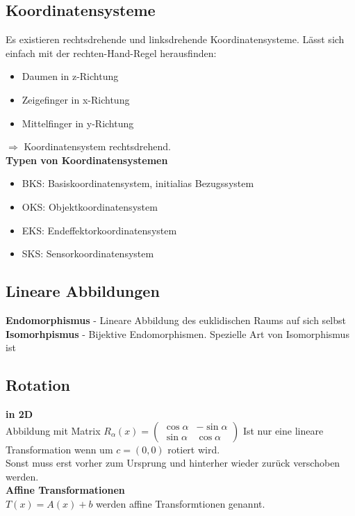 \subsection{Koordinatensysteme}
Es existieren rechtsdrehende und linksdrehende Koordinatensysteme. Lässt sich einfach mit der rechten-Hand-Regel herausfinden:
\begin{itemize}
  \item Daumen in z-Richtung
  \item Zeigefinger in x-Richtung
  \item Mittelfinger in y-Richtung
\end{itemize}
\(\Rightarrow\) Koordinatensystem rechtsdrehend.\\

\textbf{Typen von Koordinatensystemen}
\begin{itemize}
  \item BKS: Basiskoordinatensystem, initialias Bezugssystem
  \item OKS: Objektkoordinatensystem
  \item EKS: Endeffektorkoordinatensystem
  \item SKS: Sensorkoordinatensystem
\end{itemize}

\subsection{Lineare Abbildungen}
\textbf{Endomorphismus} - Lineare Abbildung des euklidischen Raums auf sich selbst\\
\textbf{Isomorhpismus} - Bijektive Endomorphismen. Spezielle Art von Isomorphismus ist \SO

\subsection{Rotation}
\textbf{in 2D}\\
Abbildung mit Matrix \(R_\alpha(x) = \begin{pmatrix} \cos \alpha & -\sin\alpha \\ \sin \alpha & \cos \alpha\end{pmatrix}\)
Ist nur eine lineare Transformation wenn um \(c=(0,0)\) rotiert wird.\\
Sonst muss erst vorher zum Ursprung und hinterher wieder zurück verschoben werden.\\
\textbf{Affine Transformationen}\\
\(T(x) = A(x) + b\) werden affine Transformtionen genannt.\\

